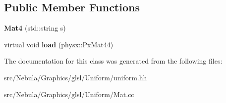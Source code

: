 \subsection*{\-Public \-Member \-Functions}
\begin{DoxyCompactItemize}
\item 
\hypertarget{classNeb_1_1glsl_1_1Uniform_1_1Scalar_1_1Mat4_ac57a935305d8c22176790fde979b5414}{{\bfseries \-Mat4} (std\-::string s)}\label{classNeb_1_1glsl_1_1Uniform_1_1Scalar_1_1Mat4_ac57a935305d8c22176790fde979b5414}

\item 
\hypertarget{classNeb_1_1glsl_1_1Uniform_1_1Scalar_1_1Mat4_ad58f9ce013be0a4a863fafd167a325e0}{virtual void {\bfseries load} (physx\-::\-Px\-Mat44)}\label{classNeb_1_1glsl_1_1Uniform_1_1Scalar_1_1Mat4_ad58f9ce013be0a4a863fafd167a325e0}

\end{DoxyCompactItemize}


\-The documentation for this class was generated from the following files\-:\begin{DoxyCompactItemize}
\item 
src/\-Nebula/\-Graphics/glsl/\-Uniform/uniform.\-hh\item 
src/\-Nebula/\-Graphics/glsl/\-Uniform/\-Mat.\-cc\end{DoxyCompactItemize}
